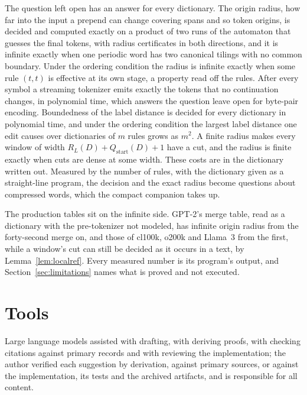 \documentclass[11pt,a4paper]{article}
\theoremstyle{definition}
\theoremstyle{plain}
\newcommand{\ripple}{R_{L}}
\begin{document}
The question \citet{berglund2023formalizing} left open has an answer for every dictionary. The origin radius, how far
into the input a prepend can change covering spans and so token origins, is decided and computed exactly on a product of
two runs of the automaton that guesses the final tokens, with radius certificates in both directions, and it is infinite
exactly when one periodic word has two canonical tilings with no common boundary. Under the ordering condition the
radius is infinite exactly when some rule \((t, t)\) is effective at its own stage, a property read off the rules. After
every symbol a streaming tokenizer emits exactly the tokens that no continuation changes, in polynomial time, which
answers the question \citet{dalirrooyfard2026online} leave open for byte-pair encoding. Boundedness of the label
distance is decided for every dictionary in polynomial time, and under the ordering condition the largest label distance
one edit causes over dictionaries of \(m\) rules grows as \(m^2\). A finite radius makes every window of width
\(\ripple(D) + Q_{\mathrm{start}}(D) + 1\) have a cut, and the radius is finite exactly when cuts are dense at some
width. These costs are in the dictionary written out. Measured by the number of rules, with the dictionary given as a
straight-line program, the decision and the exact radius become questions about compressed words, which the compact
companion takes up.

The production tables sit on the infinite side. GPT-2's merge table, read as a dictionary with the pre-tokenizer not
modeled, has infinite origin radius from the forty-second merge on, and those of cl100k, o200k and Llama~3 from the
first, while a window's cut can still be decided as it occurs in a text, by Lemma~\ref{lem:localref}. Every measured
number is its program's output, and Section~\ref{sec:limitations} names what is proved and not executed.

\section*{Tools}

Large language models assisted with drafting, with deriving proofs, with checking citations against primary records and
with reviewing the implementation; the author verified each suggestion by derivation, against primary sources, or
against the implementation, its tests and the archived artifacts, and is responsible for all content.

\appendix
\end{document}
